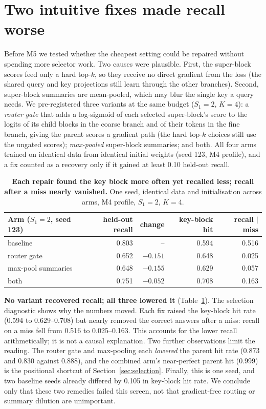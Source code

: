 \section{Two intuitive fixes made recall worse}
\label{sec:fixes}

Before M5 we tested whether the cheapest setting could be repaired without spending more selector work. Two causes
were plausible. First, the super-block scores feed only a hard top-$k$, so they receive no direct gradient from the
loss (the shared query and key projections still learn through the other branches). Second, super-block summaries
are mean-pooled, which may blur the single key a query needs. We pre-registered three variants at the same budget
($S_1{=}2$, $K{=}4$): a \emph{router gate} that adds a log-sigmoid of each selected super-block's score to the logits of its
child blocks in the coarse branch and of their tokens in the fine branch, giving the parent scores a gradient path
(the hard top-$k$ choices still use the ungated scores); \emph{max-pooled} super-block summaries; and both. All
four arms trained on identical data from identical initial weights (seed 123, M4 profile), and a fix counted as a
recovery only if it gained at least 0.10 held-out recall.

\begin{table}[t]
\centering
\small
\begin{tabular}{lrrrr}
\toprule
Arm ($S_1{=}2$, seed 123) & held-out recall & change & key-block hit & recall $\mid$ miss \\
\midrule
baseline & 0.803 & -- & 0.594 & 0.516 \\
router gate & 0.652 & $-0.151$ & 0.648 & 0.025 \\
max-pool summaries & 0.648 & $-0.155$ & 0.629 & 0.057 \\
both & 0.751 & $-0.052$ & 0.708 & 0.163 \\
\bottomrule
\end{tabular}
\caption{\textbf{Each repair found the key block more often yet recalled less; recall after a miss nearly
vanished.} One seed, identical data and initialisation across arms, M4 profile, $S_1{=}2$, $K{=}4$.}
\label{tab:fixes}
\end{table}

\textbf{No variant recovered recall; all three lowered it} (Table~\ref{tab:fixes}). The selection diagnostic shows
why the numbers moved. Each fix raised the key-block hit rate (0.594 to 0.629--0.708) but nearly removed the
correct answers after a miss: recall on a miss fell from 0.516 to 0.025--0.163. This accounts for the lower
recall arithmetically; it is not a causal explanation. Two further observations limit the reading. The router gate
and max-pooling each \emph{lowered} the parent hit rate (0.873 and 0.830 against 0.888), and the combined arm's
near-perfect parent hit (0.999) is the positional shortcut of Section~\ref{sec:selection}. Finally, this is one seed, and
two baseline seeds already differed by 0.105 in key-block hit rate. We conclude only that these two remedies failed
this screen, not that gradient-free routing or summary dilution are unimportant.
